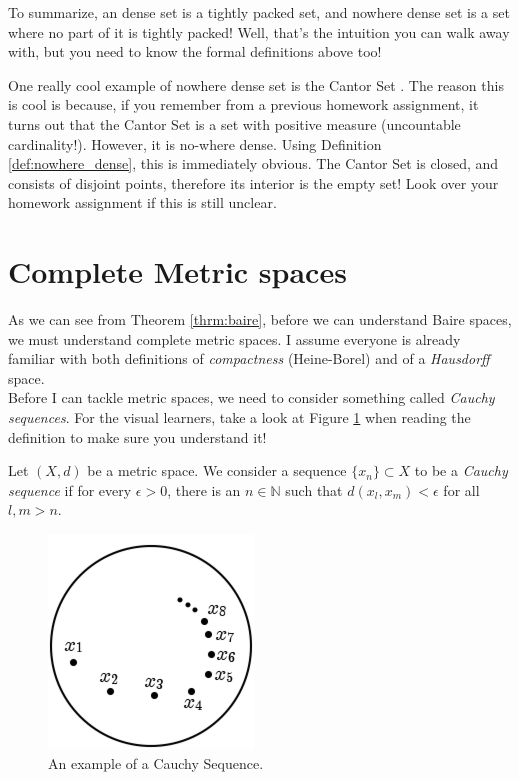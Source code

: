 \documentclass[english, 11pt]{article}
\begin{document}
  To summarize, an dense set is a tightly packed set, and nowhere dense set is a set where no part of it is tightly packed! Well, that's the intuition you can walk away with, but you need to know the formal definitions above too!

  \begin{rem}
  One really cool example of nowhere dense set is the Cantor Set \cite{cantor_set}. The reason this is cool is because, if you remember from a previous homework assignment, it turns out that the Cantor Set is a set with positive measure (uncountable cardinality!). However, it is no-where dense. Using Definition \ref{def:nowhere_dense}, this is immediately obvious. The Cantor Set is closed, and consists of disjoint points, therefore its interior is the empty set! Look over your homework assignment if this is still unclear.
  \end{rem}

  \section{Complete Metric spaces}
  As we can see from Theorem \ref{thrm:baire}, before we can understand Baire spaces, we must understand complete metric spaces. I assume everyone is already familiar with both definitions of  \textit{compactness} (Heine-Borel) and of a \textit{Hausdorff} space. \\

  Before I can tackle metric spaces, we need to consider something called \textit{Cauchy sequences}. For the visual learners, take a look at Figure \ref{fig:cauchy_sequence} when reading the definition to make sure you understand it!

  \begin{defn}
  \label{def:cauchy_sequence}
  Let $(X,d)$ be a metric space. We consider a sequence $\{x_n\} \subset X$ to be a \textit{Cauchy sequence} if for every $\epsilon > 0$, there is an $n \in \mathbb{N}$ such that $d(x_l, x_m) < \epsilon$ for all $l,m > n$.
  \end{defn}

  \begin{figure}
    \centering
    \includegraphics[scale=0.5]{converge.png}
    \caption{An example of a Cauchy Sequence.}
    \label{fig:cauchy_sequence}
  \end{figure}
\end{document}
